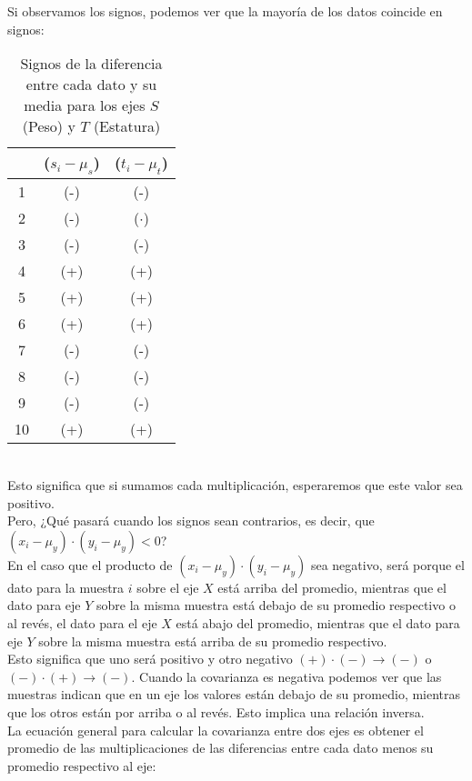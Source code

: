 \documentclass{article}
\begin{document}
Si observamos los signos, podemos ver que la mayoría de los datos coincide en signos:
\begin{table}[h!]
    \centering
    \begin{tabular}{|c|c|c|}
    \hline
    & ($s_i - \mu_s$) & ($t_i - \mu_t$) \\ \hline
    1 & (-) & (-) \\ \hline
    2 & (-) & ($\cdot$) \\ \hline
    3 & (-) & (-) \\ \hline
    4 & (+) & (+) \\ \hline
    5 & (+) & (+) \\ \hline
    6 & (+) & (+) \\ \hline
    7 & (-) & (-) \\ \hline
    8 & (-) & (-) \\ \hline
    9 & (-) & (-) \\ \hline
    10 & (+) & (+) \\ \hline
    \end{tabular}
    \caption{Signos de la diferencia entre cada dato y su media para los ejes $S$ (Peso) y $T$ (Estatura)}
\end{table}
\\
Esto significa que si sumamos cada multiplicación, esperaremos que este valor sea positivo.
\\[12pt]
Pero, ¿Qué pasará cuando los signos sean contrarios, es decir, que $(x_i - \mu_y) \cdot (y_i - \mu_y) < 0$?
\\[12pt]
En el caso que el producto de $(x_i - \mu_y) \cdot (y_i - \mu_y)$ sea negativo, será porque el dato para la muestra $i$ sobre el eje $X$ está arriba del promedio, mientras que el dato para eje $Y$ sobre la misma muestra está debajo de su promedio respectivo o al revés, el dato para el eje $X$ está abajo del promedio, mientras que el dato para eje $Y$ sobre la misma muestra está arriba de su promedio respectivo.
\\[12pt]
Esto significa que uno será positivo y otro negativo $(+) \cdot (-) \rightarrow (-)$ o $(-) \cdot (+) \rightarrow (-)$.
Cuando la covarianza es negativa podemos ver que las muestras indican que en un eje los valores están debajo de su promedio, mientras que los otros están por arriba o al revés. Esto implica una relación inversa.
\\[12pt]
La ecuación general para calcular la covarianza entre dos ejes es obtener el promedio de las multiplicaciones de las diferencias entre cada dato menos su promedio respectivo al eje:
\end{document}
